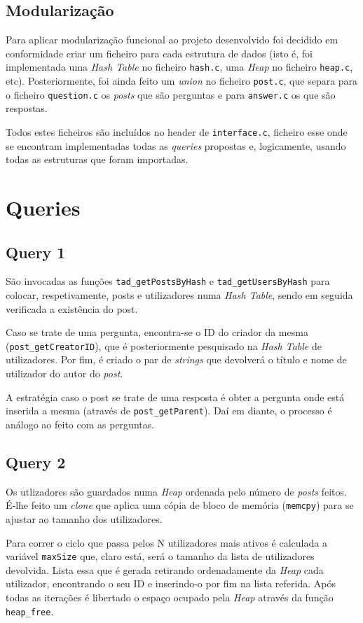 \documentclass[a4paper]{report}
\begin{document}
	\section{Modularização}
		\tab Para aplicar modularização funcional ao projeto desenvolvido foi decidido em conformidade criar um ficheiro para cada estrutura de dados (isto é, foi implementada uma \textit{Hash Table} no ficheiro \verb+hash.c+, uma \textit{Heap} no ficheiro \verb+heap.c+, etc). Posteriormente, foi ainda feito um \textit{union} no ficheiro \verb+post.c+, que separa para o ficheiro \verb+question.c+ os \textit{posts} que são perguntas e para \verb+answer.c+ os que são respostas. \par
	Todos estes ficheiros são incluídos no header de \verb+interface.c+, ficheiro esse onde se encontram implementadas todas as \textit{queries} propostas e, logicamente, usando todas as estruturas que foram importadas.

\chapter{Queries}
	\section{Query 1}
	\tab São invocadas as funções \verb+tad_getPostsByHash+ e \verb+tad_getUsersByHash+ para colocar, respetivamente, posts e utilizadores numa \textit{Hash Table}, sendo em seguida verificada a existência do post.\par
	Caso se trate de uma pergunta, encontra-se o ID do criador da mesma \\(\verb+post_getCreatorID+), que é posteriormente pesquisado na \textit{Hash Table} de utilizadores. Por fim, é criado o par de \textit{strings} que devolverá o título e nome de utilizador do autor do \textit{post}.\par
	 A estratégia caso o post se trate de uma resposta é obter a pergunta onde está inserida a mesma (através de \verb+post_getParent+). Daí em diante, o processo é análogo ao feito com as perguntas.

	\section{Query 2}
	 \tab Os utlizadores são guardados numa \textit{Heap} ordenada pelo número de \textit{posts} feitos. É-lhe feito um \textit{clone} que aplica uma cópia de bloco de memória (\verb+memcpy+) para se ajustar ao tamanho dos utilizadores.\par
	 Para correr o ciclo que passa pelos N utilizadores mais ativos é calculada a variável \verb+maxSize+ que, claro está, será o tamanho da lista de utilizadores devolvida. Lista essa que é gerada retirando ordenadamente da \textit{Heap} cada utilizador, encontrando o seu ID e inserindo-o por fim na lista referida. Após todas as iterações é libertado o espaço ocupado pela \textit{Heap} através da função \verb+heap_free+.
\end{document}
